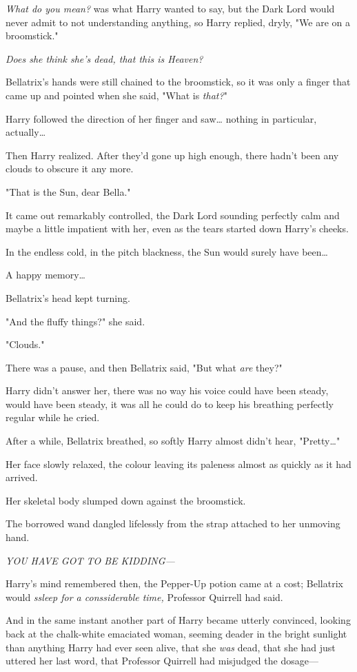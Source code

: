 \emph{What do you mean?} was what Harry wanted to say, but the Dark Lord would
never admit to not understanding anything, so Harry replied, dryly, "We are on
a broomstick."

\emph{Does she think she's dead, that this is Heaven?}

Bellatrix's hands were still chained to the broomstick, so it was only a finger
that came up and pointed when she said, "What is \emph{that?}"

Harry followed the direction of her finger and saw{\ldots} nothing in
particular, actually{\ldots}

Then Harry realized. After they'd gone up high enough, there hadn't been any
clouds to obscure it any more.

"That is the Sun, dear Bella."

It came out remarkably controlled, the Dark Lord sounding perfectly calm and
maybe a little impatient with her, even as the tears started down Harry's
cheeks.

In the endless cold, in the pitch blackness, the Sun would surely have
been{\ldots}

A happy memory{\ldots}

Bellatrix's head kept turning.

"And the fluffy things?" she said.

"Clouds."

There was a pause, and then Bellatrix said, "But what \emph{are} they?"

Harry didn't answer her, there was no way his voice could have been steady,
would have been steady, it was all he could do to keep his breathing perfectly
regular while he cried.

After a while, Bellatrix breathed, so softly Harry almost didn't hear,
"Pretty{\ldots}"

Her face slowly relaxed, the colour leaving its paleness almost as quickly as it
had arrived.

Her skeletal body slumped down against the broomstick.

The borrowed wand dangled lifelessly from the strap attached to her unmoving
hand.

\emph{YOU HAVE GOT TO BE KIDDING---}

Harry's mind remembered then, the Pepper-Up potion came at a cost; Bellatrix
would \emph{ssleep for a conssiderable time,} Professor Quirrell had said.

And in the same instant another part of Harry became utterly convinced, looking
back at the chalk-white emaciated woman, seeming deader in the bright sunlight
than anything Harry had ever seen alive, that she \emph{was} dead, that she had
just uttered her last word, that Professor Quirrell had misjudged the dosage---

